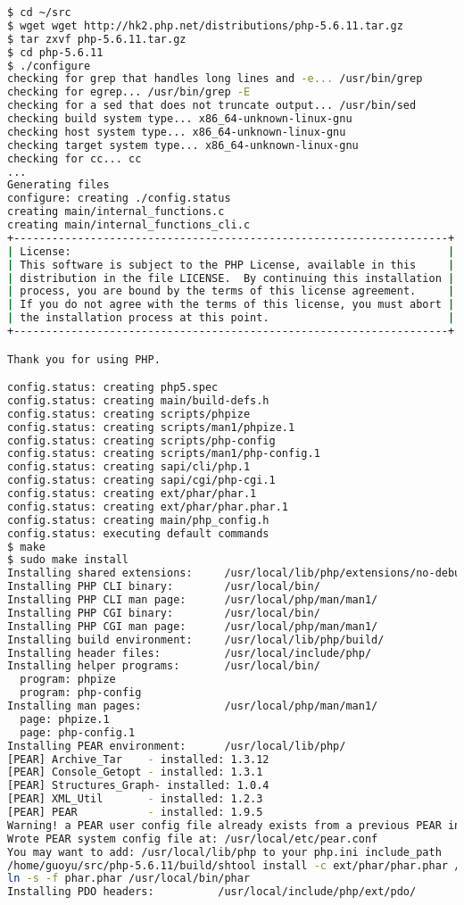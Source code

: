 \begin{lstlisting}[language=bash]
$ cd ~/src
$ wget wget http://hk2.php.net/distributions/php-5.6.11.tar.gz
$ tar zxvf php-5.6.11.tar.gz
$ cd php-5.6.11
$ ./configure
checking for grep that handles long lines and -e... /usr/bin/grep
checking for egrep... /usr/bin/grep -E
checking for a sed that does not truncate output... /usr/bin/sed
checking build system type... x86_64-unknown-linux-gnu
checking host system type... x86_64-unknown-linux-gnu
checking target system type... x86_64-unknown-linux-gnu
checking for cc... cc
...
Generating files
configure: creating ./config.status
creating main/internal_functions.c
creating main/internal_functions_cli.c
+--------------------------------------------------------------------+
| License:                                                           |
| This software is subject to the PHP License, available in this     |
| distribution in the file LICENSE.  By continuing this installation |
| process, you are bound by the terms of this license agreement.     |
| If you do not agree with the terms of this license, you must abort |
| the installation process at this point.                            |
+--------------------------------------------------------------------+

Thank you for using PHP.

config.status: creating php5.spec
config.status: creating main/build-defs.h
config.status: creating scripts/phpize
config.status: creating scripts/man1/phpize.1
config.status: creating scripts/php-config
config.status: creating scripts/man1/php-config.1
config.status: creating sapi/cli/php.1
config.status: creating sapi/cgi/php-cgi.1
config.status: creating ext/phar/phar.1
config.status: creating ext/phar/phar.phar.1
config.status: creating main/php_config.h
config.status: executing default commands
$ make 
$ sudo make install
Installing shared extensions:     /usr/local/lib/php/extensions/no-debug-non-zts-20131226/
Installing PHP CLI binary:        /usr/local/bin/
Installing PHP CLI man page:      /usr/local/php/man/man1/
Installing PHP CGI binary:        /usr/local/bin/
Installing PHP CGI man page:      /usr/local/php/man/man1/
Installing build environment:     /usr/local/lib/php/build/
Installing header files:          /usr/local/include/php/
Installing helper programs:       /usr/local/bin/
  program: phpize
  program: php-config
Installing man pages:             /usr/local/php/man/man1/
  page: phpize.1
  page: php-config.1
Installing PEAR environment:      /usr/local/lib/php/
[PEAR] Archive_Tar    - installed: 1.3.12
[PEAR] Console_Getopt - installed: 1.3.1
[PEAR] Structures_Graph- installed: 1.0.4
[PEAR] XML_Util       - installed: 1.2.3
[PEAR] PEAR           - installed: 1.9.5
Warning! a PEAR user config file already exists from a previous PEAR installation at '/root/.pearrc'. You may probably want to remove it.
Wrote PEAR system config file at: /usr/local/etc/pear.conf
You may want to add: /usr/local/lib/php to your php.ini include_path
/home/guoyu/src/php-5.6.11/build/shtool install -c ext/phar/phar.phar /usr/local/bin
ln -s -f phar.phar /usr/local/bin/phar
Installing PDO headers:          /usr/local/include/php/ext/pdo/
\end{lstlisting}




